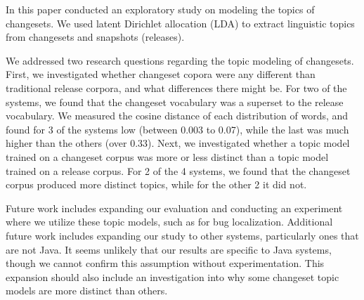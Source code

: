 
In this paper conducted an exploratory study on modeling the topics of
changesets.
We used latent Dirichlet allocation (LDA) to extract linguistic
topics from changesets and snapshots (releases).

We addressed two research questions regarding the topic modeling of changesets.
First, we investigated whether changeset copora were any different than
traditional release corpora, and what differences there might be.
For two of the systems, we found that the changeset vocabulary was a superset
to the release vocabulary.
We measured the cosine distance of each distribution of words,
and found for 3 of the systems low (between 0.003 to 0.07),
while the last was much higher than the others (over 0.33).
Next, we investigated whether a topic model trained on a changeset corpus
was more or less distinct than a topic model trained on a release corpus.
For 2 of the 4 systems, we found that the changeset corpus produced more
distinct topics, while for the other 2 it did not.


Future work includes expanding our evaluation and conducting an experiment
where we utilize these topic models, such as for bug localization.
Additional future work includes expanding our study to other systems, particularly ones that are not Java.
It seems unlikely that our results are specific to Java systems, though we cannot confirm this assumption without experimentation.
This expansion should also include an investigation into why some
changeset topic models are more distinct than others.
 
